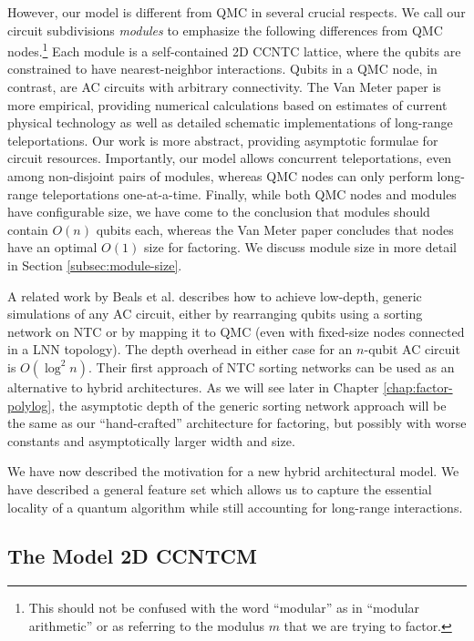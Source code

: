 However, our model is different from \textsf{QMC} in several crucial
respects. We call our circuit subdivisions \emph{modules}
to emphasize the following differences from
\textsf{QMC} nodes.\footnote{This should not be
confused with the word ``modular'' as in ``modular arithmetic'' or as
referring to the modulus $m$ that we are trying to factor.}
Each module is a self-contained \textsf{2D CCNTC} lattice, where the qubits
are constrained to have nearest-neighbor interactions. Qubits in a
\textsf{QMC} node,
in contrast, are \textsf{AC} circuits with arbitrary connectivity. The
Van Meter paper is more empirical, providing numerical calculations
based on estimates of current physical technology as well as detailed
schematic implementations of long-range teleportations. Our work is more
abstract, providing asymptotic formulae for circuit resources. Importantly,
our model allows concurrent teleportations, even among non-disjoint
pairs of modules, whereas \textsf{QMC} nodes can only perform long-range
teleportations one-at-a-time. Finally,
while both \textsf{QMC} nodes and modules have configurable size, we have come to the
conclusion that modules should contain $O(n)$ qubits each, whereas
the Van Meter paper concludes that nodes have an optimal $O(1)$ size for 
factoring.
We discuss module size in more detail in Section \ref{subsec:module-size}.

A related work by Beals et al. \cite{Beals2012} describes how to achieve
low-depth, generic simulations of any \textsf{AC} circuit, either by
rearranging qubits using a sorting network on \textsf{NTC} or
by mapping it to \textsf{QMC}
(even with fixed-size nodes connected in a \textsf{LNN} topology). The
depth overhead in either case for an $n$-qubit \textsf{AC} circuit is $O(\log^2 n)$. Their first approach of \textsf{NTC} sorting networks can be used
as an alternative to hybrid architectures. As we will see later in
Chapter \ref{chap:factor-polylog}, the asymptotic depth of the generic sorting network approach will be the same as our ``hand-crafted'' architecture for factoring,
but possibly with worse constants and asymptotically larger width and size. 

We have now described the motivation for a new hybrid architectural model.
We have described a general feature set which
allows us to capture the essential locality of a quantum algorithm while
still accounting for long-range interactions.

\subsection{The Model \textsf{2D CCNTCM}}
\label{subsec:2dccntcm}


